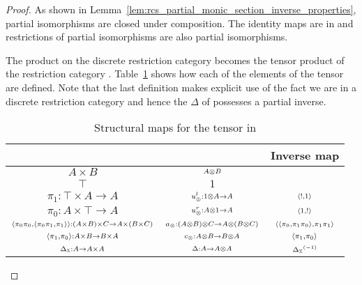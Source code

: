 \begin{proof}
  As shown in Lemma~\ref{lem:rcs_partial_monic_section_inverse_properties}, partial isomorphisms
  are closed under composition. The identity maps are in \Invc{\X} and restrictions of
  partial isomorphisms are also partial isomorphisms.

  The product on the discrete restriction category \X becomes the tensor product of the restriction
  category \Invc{\X}. Table~\ref{tab:structural_maps_for_the_tensor_in_invx} shows how each of the
  elements of the tensor are defined. Note that the last definition makes explicit use of the fact
  we are in a discrete restriction category and hence the $\Delta$ of \X possesses a partial
  inverse.

  \begin{table}[h!]
    \begin{center}
      \begin{tabular}{|ccc|}
        \hline
        \X & \Invc{\X} & Inverse map\\
        \hline\hline
        $\scriptstyle A\times B$ & $\scriptstyle A\otimes B$ &\\
        \hline
        $\scriptstyle \top$ & $\scriptstyle 1$ &\\
        \hline
        $\scriptstyle \pi_1:\top\times A \to A$ & $\scriptstyle u_{\otimes}^l:1\otimes A \to A$ & $\scriptstyle \langle!,1\rangle$\\
        \hline
        $\scriptstyle \pi_0:A\times\top \to A$ & $\scriptstyle u_{\otimes}^r:A\otimes1 \to A$& $\scriptstyle \langle1,!\rangle$\\
        \hline
        ${\scriptstyle \langle\pi_0 \pi_0,\langle\pi_0 \pi_1,\pi_1\rangle\rangle:(A\times B)\times C \to A\times(B\times C)}$
          & $\scriptstyle a_{\otimes}:(A\otimes B)\otimes C \to A\otimes(B\otimes C)$
          & $\scriptstyle \langle\langle\pi_0, \pi_1 \pi_0\rangle,\pi_1 \pi_1\rangle$\\
        \hline
        $\scriptstyle \langle \pi_1,\pi_0\rangle:A\times B \to B\times A$ & $\scriptstyle c_{\otimes}:A\otimes B \to B \otimes A$ & $\scriptstyle \langle \pi_1,\pi_0\rangle$\\
        \hline
        $\scriptstyle \Delta_{\mathbb{X}}:A\to A\times A$ & $\scriptstyle \Delta:A \to A\otimes A$ & $\scriptstyle  {\Delta_{\ensuremath{\mathbb{X}}}}^{(-1)} $\\
        \hline
      \end{tabular}

    \end{center}
    \caption{Structural maps for the tensor in \Invc{\X}}
    \label{tab:structural_maps_for_the_tensor_in_invx}
  \end{table}


\end{proof}

